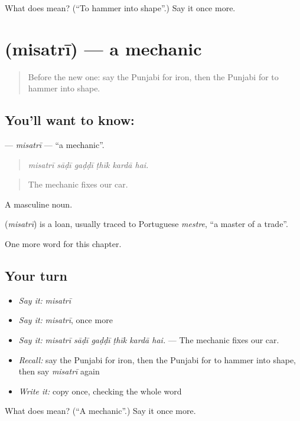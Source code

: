 \begin{tcolorbox}[breakable,colback=teal!4,colframe=teal!35!black,title={Before you move on}]
What does  mean? (\textquotedblleft{}To hammer into shape\textquotedblright{}.) Say it once more.
\end{tcolorbox}
\section[\texorpdfstring{\pa{ਮਿਸਤਰੀ} (misatrī)}{ਮਿਸਤਰੀ (misatrī)}]{ (misatrī) — a mechanic}

\label{lesson:PA-C335-misatri}



\begin{quote}
Before the new one: say the Punjabi for iron, then the Punjabi for to hammer into shape.
\end{quote}

\subsection*{You'll want to know: }
\textbf{} — \emph{misatrī} — \textquotedblleft{}a mechanic\textquotedblright{}.

\begin{quote}
     
\end{quote}

\begin{quote}
\emph{misatrī sāḍī gaḍḍī ṭhīk kardā hai.}
\end{quote}

\begin{quote}
The mechanic fixes our car.
\end{quote}

A masculine noun.

\begin{cousinweb}
\textbf{} (\emph{misatrī}) is a loan, usually traced to Portuguese \emph{mestre}, \textquotedblleft{}a master of a trade\textquotedblright{}.
\end{cousinweb}

\begin{grammarlens}[title={What you've built}]
One more word for this chapter.
\end{grammarlens}

\subsection*{Your turn}
\begin{itemize}
\raggedright
  \item \emph{Say it:} \emph{misatrī}
  \item \emph{Say it:} \emph{misatrī}, once more
  \item \emph{Say it:} \emph{misatrī sāḍī gaḍḍī ṭhīk kardā hai.} — The mechanic fixes our car.
  \item \emph{Recall:} say the Punjabi for iron, then the Punjabi for to hammer into shape, then say \emph{misatrī} again
  \item \emph{Write it:} copy \textbf{} once, checking the whole word
\end{itemize}

\begin{tcolorbox}[breakable,colback=teal!4,colframe=teal!35!black,title={Before you move on}]
What does  mean? (\textquotedblleft{}A mechanic\textquotedblright{}.) Say it once more.
\end{tcolorbox}
